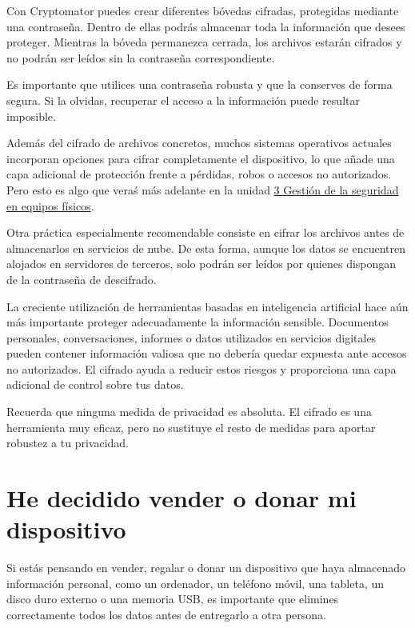 \documentclass[
  spanish,
  a4paper,
  openany]{book}
\begin{document}
Con Cryptomator puedes crear diferentes bóvedas cifradas, protegidas mediante una contraseña. Dentro de ellas podrás almacenar toda la información que desees proteger. Mientras la bóveda permanezca cerrada, los archivos estarán cifrados y no podrán ser leídos sin la contraseña correspondiente.

Es importante que utilices una contraseña robusta y que la conserves de forma segura. Si la olvidas, recuperar el acceso a la información puede resultar imposible.

Además del cifrado de archivos concretos, muchos sistemas operativos actuales incorporan opciones para cifrar completamente el dispositivo, lo que añade una capa adicional de protección frente a pérdidas, robos o accesos no autorizados. Pero esto es algo que veraś más adelante en la unidad \hyperref[gestiuxf3n-de-la-seguridad-en-equipos-fuxedsicos]{3 Gestión de la seguridad en equipos físicos}.

Otra práctica especialmente recomendable consiste en cifrar los archivos antes de almacenarlos en servicios de nube. De esta forma, aunque los datos se encuentren alojados en servidores de terceros, solo podrán ser leídos por quienes dispongan de la contraseña de descifrado.

La creciente utilización de herramientas basadas en inteligencia artificial hace aún más importante proteger adecuadamente la información sensible. Documentos personales, conversaciones, informes o datos utilizados en servicios digitales pueden contener información valiosa que no debería quedar expuesta ante accesos no autorizados. El cifrado ayuda a reducir estos riesgos y proporciona una capa adicional de control sobre tus datos.

Recuerda que ninguna medida de privacidad es absoluta. El cifrado es una herramienta muy eficaz, pero no sustituye el resto de medidas para aportar robustez a tu privacidad.

\section{He decidido vender o donar mi dispositivo}\label{he-decidido-vender-o-donar-mi-dispositivo}

Si estás pensando en vender, regalar o donar un dispositivo que haya almacenado información personal, como un ordenador, un teléfono móvil, una tableta, un disco duro externo o una memoria USB, es importante que elimines correctamente todos los datos antes de entregarlo a otra persona.
\end{document}
